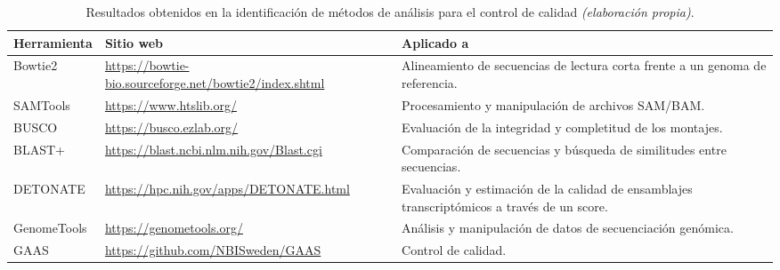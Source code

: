 \documentclass[12pt]{article}
\begin{document}
\begin{table}[htbp]
    \centering
    \caption{Resultados obtenidos en la identificación de métodos de análisis para el control de calidad \emph{(elaboración propia)}.}
    \label{tabla:control_calidad}
    \begin{tabularx}{\textwidth}{|p{3cm}|X|X|}
        \hline
        \textbf{Herramienta} & \textbf{Sitio web} & \textbf{Aplicado a} \\
        \hline
        Bowtie2 & \href{https://bowtie-bio.sourceforge.net/bowtie2/index.shtml}{\url{https://bowtie-bio.sourceforge.net/bowtie2/index.shtml}} & Alineamiento de secuencias de lectura corta frente a un genoma de referencia. \\
        \hline
        SAMTools & \href{https://www.htslib.org/}{\url{https://www.htslib.org/}} & Procesamiento y manipulación de archivos SAM/BAM. \\
        \hline
        BUSCO & \href{https://busco.ezlab.org/}{\url{https://busco.ezlab.org/}} & Evaluación de la integridad y completitud de los montajes. \\
        \hline
        BLAST+ & \href{https://blast.ncbi.nlm.nih.gov/Blast.cgi}{\url{https://blast.ncbi.nlm.nih.gov/Blast.cgi}} & Comparación de secuencias y búsqueda de similitudes entre secuencias. \\
        \hline
        DETONATE & \href{https://hpc.nih.gov/apps/DETONATE.html}{\url{https://hpc.nih.gov/apps/DETONATE.html}} & Evaluación y estimación de la calidad de ensamblajes transcriptómicos a través de un score. \\
        \hline
        GenomeTools & \href{https://genometools.org/}{\url{https://genometools.org/}} & Análisis y manipulación de datos de secuenciación genómica. \\
        \hline
        GAAS & \href{https://github.com/NBISweden/GAAS}{\url{https://github.com/NBISweden/GAAS}} & Control de calidad. \\
        \hline
    \end{tabularx}
\end{table}
\end{document}
